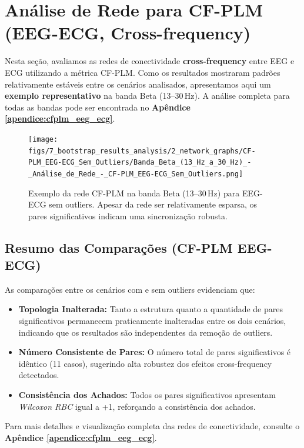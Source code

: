 \section{Análise de Rede para CF-PLM (EEG-ECG, Cross-frequency)}
\label{sec:rede_cfplm_eeg_ecg}

Nesta seção, avaliamos as redes de conectividade \textbf{cross-frequency} entre EEG e ECG utilizando a métrica CF-PLM. Como os resultados mostraram padrões relativamente estáveis entre os cenários analisados, apresentamos aqui um \textbf{exemplo representativo} na banda Beta (13--30\,Hz). A análise completa para todas as bandas pode ser encontrada no \textbf{Apêndice \ref{apendice:cfplm_eeg_ecg}}.

\begin{figure}[htb]
  \centering
  \texttt{[image: figs/7\_bootstrap\_results\_analysis/2\_network\_graphs/CF-PLM\_EEG-ECG\_Sem\_Outliers/Banda\_Beta\_(13\_Hz\_a\_30\_Hz)\_-\_Análise\_de\_Rede\_-\_CF-PLM\_EEG-ECG\_Sem\_Outliers.png]}
  \caption{Exemplo da rede CF-PLM na banda Beta (13--30\,Hz) para EEG-ECG sem outliers. Apesar da rede ser relativamente esparsa, os pares significativos indicam uma sincronização robusta.}
  \label{fig:exemplo_rede_cfplm_beta_sem}
\end{figure}

\subsection{Resumo das Comparações (CF-PLM EEG-ECG)}

As comparações entre os cenários com e sem outliers evidenciam que:
\begin{itemize}
    \item \textbf{Topologia Inalterada:} Tanto a estrutura quanto a quantidade de pares significativos permanecem praticamente inalteradas entre os dois cenários, indicando que os resultados são independentes da remoção de outliers.
    \item \textbf{Número Consistente de Pares:} O número total de pares significativos é idêntico (11 casos), sugerindo alta robustez dos efeitos cross-frequency detectados.
    \item \textbf{Consistência dos Achados:} Todos os pares significativos apresentam \emph{Wilcoxon RBC} igual a +1, reforçando a consistência dos achados.
\end{itemize}

Para mais detalhes e visualização completa das redes de conectividade, consulte o \textbf{Apêndice \ref{apendice:cfplm_eeg_ecg}}.

